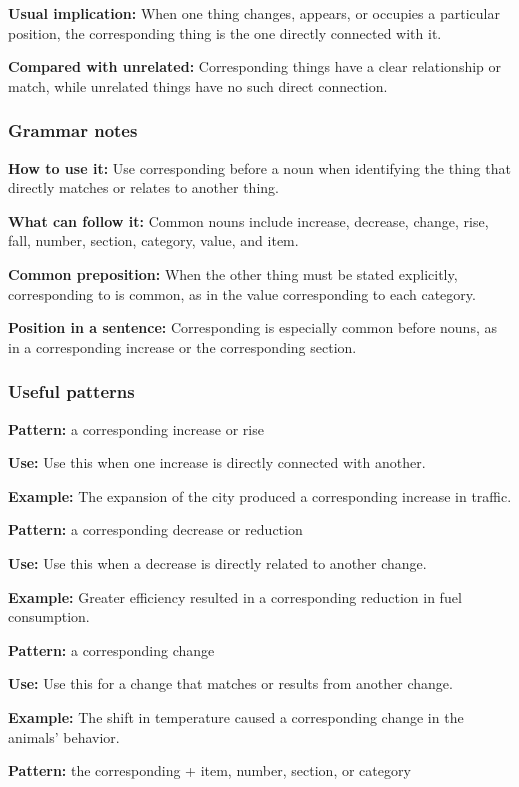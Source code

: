 \documentclass[11pt]{article}
\begin{document}
\textbf{Usual implication:} When one thing changes, appears, or occupies a particular position, the corresponding thing is the one directly connected with it.

\textbf{Compared with unrelated:} Corresponding things have a clear relationship or match, while unrelated things have no such direct connection.

\subsubsection{Grammar notes}
\textbf{How to use it:} Use corresponding before a noun when identifying the thing that directly matches or relates to another thing.

\textbf{What can follow it:} Common nouns include increase, decrease, change, rise, fall, number, section, category, value, and item.

\textbf{Common preposition:} When the other thing must be stated explicitly, corresponding to is common, as in the value corresponding to each category.

\textbf{Position in a sentence:} Corresponding is especially common before nouns, as in a corresponding increase or the corresponding section.

\subsubsection{Useful patterns}
\textbf{Pattern:} a corresponding increase or rise

\textbf{Use:} Use this when one increase is directly connected with another.

\textbf{Example:} The expansion of the city produced a corresponding increase in traffic.

\textbf{Pattern:} a corresponding decrease or reduction

\textbf{Use:} Use this when a decrease is directly related to another change.

\textbf{Example:} Greater efficiency resulted in a corresponding reduction in fuel consumption.

\textbf{Pattern:} a corresponding change

\textbf{Use:} Use this for a change that matches or results from another change.

\textbf{Example:} The shift in temperature caused a corresponding change in the animals' behavior.

\textbf{Pattern:} the corresponding + item, number, section, or category
\end{document}
